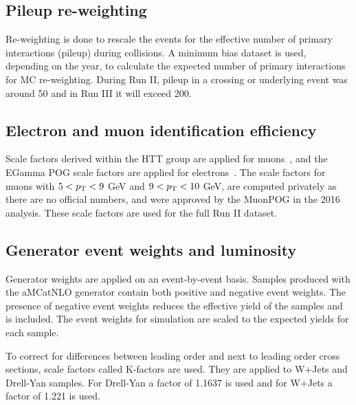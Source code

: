 \subsection{Pileup re-weighting}
\label{sec:pileup}

Re-weighting is done to rescale the events for the effective number of primary interactions (pileup) during collisions. A minimum bias dataset is used, depending on the year, to calculate the expected number of primary interactions for MC re-weighting.
During Run II, pileup in a crossing or underlying event was around 50 and in Run III it will exceed 200.   

\subsection{Electron and muon identification efficiency}

Scale factors derived within the HTT group are applied for muons~\cite{SMHTTarXiv}, and the EGamma POG scale factors are applied for electrons~\cite{EGammaMVAID}. The scale factors for muons with $5<p_{\mathrm{T}}<9$ GeV and $9<p_{\mathrm{T}}<10$ GeV, are computed privately as there are no official numbers, and were approved by the MuonPOG in the 2016 analysis. These scale factors are used for the full Run II dataset. 
  


\subsection{Generator event weights and luminosity}

Generator weights are applied on an event-by-event basis. Samples produced with the aMCatNLO generator contain both positive and negative event weights. The presence of negative event weights reduces the effective yield of the samples and is included.
The event weights for simulation are scaled to the expected yields for each sample. 

To correct for differences between leading order and next to leading order cross sections, scale factors called K-factors are used. They are applied to W+Jets and Drell-Yan samples. For Drell-Yan a factor of 1.1637 is used and for W+Jets a factor of 1.221 is used.

